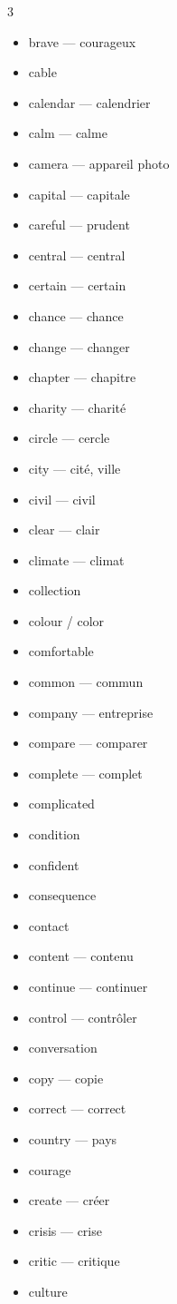 \begin{tableau}
\begin{multicols}{3}
\begin{anglais}
\begin{itemize}
\item brave --- courageux
\item cable
\item calendar --- calendrier
\item calm --- calme
\item camera --- appareil photo
\item capital --- capitale
\item careful --- prudent
\item central --- central
\item certain --- certain
\item chance --- chance
\item change --- changer
\item chapter --- chapitre
\item charity --- charité
\item circle --- cercle
\item city --- cité, ville
\item civil --- civil
\item clear --- clair
\item climate --- climat
\item collection
\item colour / color
\item comfortable
\item common --- commun
\item company --- entreprise
\item compare --- comparer
\item complete --- complet
\item complicated
\item condition
\item confident
\item consequence
\item contact
\item content --- contenu
\item continue --- continuer
\item control --- contrôler
\item conversation
\item copy --- copie
\item correct --- correct
\item country --- pays
\item courage
\item create --- créer
\item crisis --- crise
\item critic --- critique
\item culture

\end{itemize}
\end{anglais}
\end{multicols}
\end{tableau}
